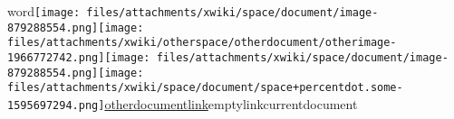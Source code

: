 \documentclass{article}
\begin{document}
word\texttt{[image: files/attachments/xwiki/space/document/image-879288554.png]}\texttt{[image: files/attachments/xwiki/otherspace/otherdocument/otherimage-1966772742.png]}\texttt{[image: files/attachments/xwiki/space/document/image-879288554.png]}\texttt{[image: files/attachments/xwiki/space/document/space+percentdot.some-1595697294.png]}\href{http://test/bin/view/OtherSpace/OtherDocument}{otherdocumentlink}emptylinkcurrentdocument
\end{document}
